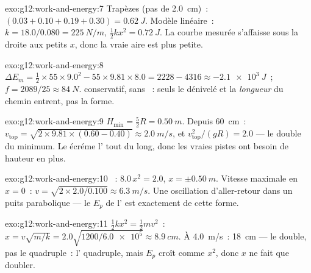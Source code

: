 \begin{solution}{exo:g12:work-and-energy:7}
Trapèzes (pas de \qty{2.0}{cm})~: $(0.03 + 0.10 + 0.19 + 0.30) =
\qty{0.62}{J}$. Modèle linéaire~: $k = 18.0/0.080 =
\qty{225}{N/m}$, $\tfrac12 kx^2 = \qty{0.72}{J}$. La courbe mesurée
s'affaisse sous la droite aux petits $x$, donc la vraie aire est
plus petite.
\end{solution}

\begin{solution}{exo:g12:work-and-energy:8}
$\Delta E_m = \tfrac12 \times 55 \times 9.0^2 - 55 \times 9.81 \times
8.0 = 2228 - 4316 \approx \qty{-2.1e3}{J}$~;
$f = 2089/25 \approx \qty{84}{N}$. 
conservatif,  sans
~: seuls le dénivelé et la \emph{longueur} du chemin entrent,
pas la forme.
\end{solution}

\begin{solution}{exo:g12:work-and-energy:9}
$H_{\min} = \tfrac52 R = \qty{0.50}{m}$. Depuis \qty{60}{cm}~:
$v_{\text{top}} = \sqrt{2 \times 9.81 \times (0.60 - 0.40)} \approx
\qty{2.0}{m/s}$, et $v_{\text{top}}^2/(gR) = 2.0$ --- le double du
minimum. Le  écréme l'
tout du long, donc les vraies pistes ont besoin de hauteur en plus.
\end{solution}

\begin{solution}{exo:g12:work-and-energy:10}
~: $8.0\,x^2 = 2.0$,
$x = \pm\qty{0.50}{m}$. Vitesse maximale en $x = 0$~:
$v = \sqrt{2 \times 2.0/0.100} \approx \qty{6.3}{m/s}$. Une
oscillation d'aller-retour dans un puits parabolique --- le $E_p$ de
l' est exactement de
cette forme.
\end{solution}

\begin{solution}{exo:g12:work-and-energy:11}
$\tfrac12 kx^2 = \tfrac12 mv^2$~:
$x = v\sqrt{m/k} = 2.0\sqrt{1200/\num{6.0e5}} \approx \qty{8.9}{cm}$.
À \qty{4.0}{m/s}~: \qty{18}{cm} --- le double, pas le quadruple~:
l' quadruple, mais $E_p$ croît comme $x^2$,
donc $x$ ne fait que doubler.
\end{solution}

